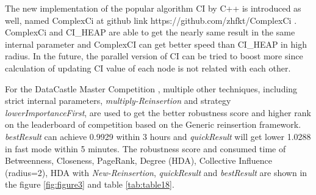 \documentclass{article}
\begin{document}
	The new implementation of the popular algorithm CI by C++ is introduced as well, named ComplexCi at github link https://github.com/zhfkt/ComplexCi \cite{zhfktgithub}. ComplexCi and CI\_HEAP are able to get the nearly same result in the same internal parameter and ComplexCI can get better speed than CI\_HEAP in high radius.	In the future, the parallel version of CI can be tried to boost more since calculation of updating CI value of each node is not related with each other.
	
	For the DataCastle Master Competition , multiple other techniques, including strict internal parameters, \textit{multiply-Reinsertion} and strategy \textit{lowerImportanceFirst},  are used to get the better robustness score and higher rank on the leaderboard of competition based on the Generic reinsertion framework. \textit{bestResult} can achieve 0.9929 within 3 hours and \textit{quickResult} will get lower 1.0288 in fast mode within 5 minutes. The robustness score and consumed time of Betweenness, Closeness, PageRank, Degree (HDA), Collective Influence (radius=2), HDA with \textit{New-Reinsertion}, \textit{quickResult} and \textit{bestResult} are shown in the figure \ref{fig:figure3} and table \ref{tab:table18}.
	
\end{document}
